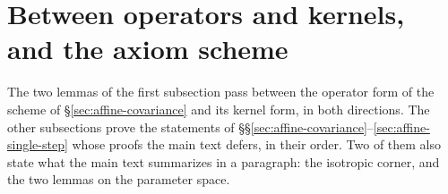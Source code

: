 
\section{Between operators and kernels, and the axiom scheme}\label{app:classical}

The two lemmas of the first subsection pass between the operator form of the scheme of
\S\ref{sec:affine-covariance} and its kernel form, in both directions. The other subsections prove the statements of
\S\S\ref{sec:affine-covariance}--\ref{sec:affine-single-step} whose proofs the main text defers, in
their order. Two of them also state what the main text summarizes in a paragraph: the isotropic
corner, and the two lemmas on the parameter space.


